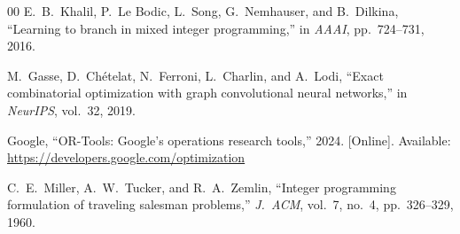 \documentclass[conference]{IEEEtran}
\begin{document}
\begin{thebibliography}{00}
 E.~B.~Khalil, P.~Le Bodic, L.~Song, G.~Nemhauser, and B.~Dilkina, ``Learning to branch in mixed integer programming,'' in \emph{AAAI}, pp.~724--731, 2016.

 M.~Gasse, D.~Ch\'{e}telat, N.~Ferroni, L.~Charlin, and A.~Lodi, ``Exact combinatorial optimization with graph convolutional neural networks,'' in \emph{NeurIPS}, vol.~32, 2019.

 Google, ``OR-Tools: Google's operations research tools,'' 2024. [Online]. Available: \url{https://developers.google.com/optimization}

 C.~E.~Miller, A.~W.~Tucker, and R.~A.~Zemlin, ``Integer programming formulation of traveling salesman problems,'' \emph{J.\ ACM}, vol.~7, no.~4, pp.~326--329, 1960.

\end{thebibliography}
\end{document}
